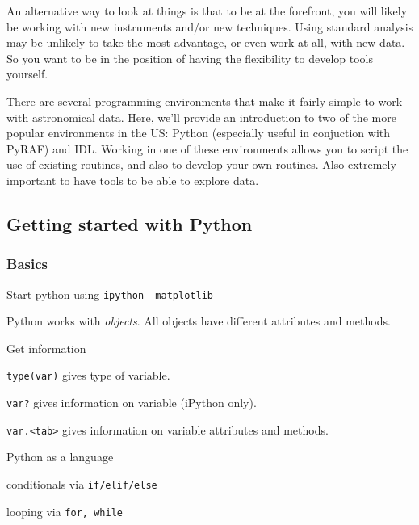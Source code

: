 \documentclass{article}
\begin{document}
An alternative way to look at things is that to be at the forefront,
you will likely be working with new instruments and/or new techniques.
Using standard analysis may be unlikely to take the most advantage, or
even work at all, with new data. So you want to be in the position of
having the flexibility to develop tools yourself.

There are several programming environments that make it fairly simple
to work with astronomical data. Here, we'll provide an introduction to
two of the more popular environments in the US: Python (especially
useful in conjuction with PyRAF) and IDL\@. Working in one of these
environments allows you to script the use of existing routines, and
also to develop your own routines. Also extremely important to have
tools to be able to explore data.

\subsection*{Getting started with Python}
\subsubsection*{Basics}
\begin{itemize*}
    \item Start python using \verb|ipython -matplotlib|
    \item Python works with \emph{objects}. All objects have different
        attributes and methods.
    \item Get information
        \begin{itemize*}
            \item \verb|type(var)| gives type of variable.
            \item \verb|var?| gives information on variable (iPython
                only).
            \item \verb|var.<tab>| gives information on variable
                attributes and methods.
        \end{itemize*}
    \item Python as a language
        \begin{itemize*}
            \item conditionals via \verb|if/elif/else|
            \item looping via \verb|for, while|
        \end{itemize*}
\end{itemize*}
\end{document}
